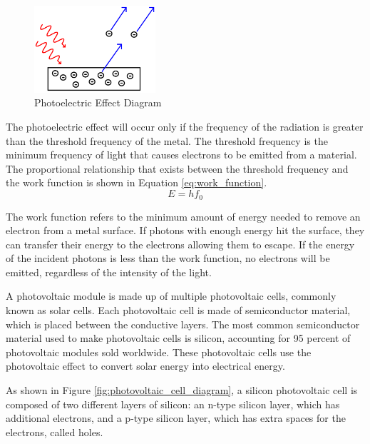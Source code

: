 \begin{figure}[ht]
    \centering
    \includegraphics[width=0.4\textwidth]{Figures/photoelectric_effect_diagram.png}
    \caption{Photoelectric Effect Diagram \cite{KhanAcademyPhotoelectricEffect}}
    \label{fig:photoelectric_effect_diagram}
\end{figure}
\FloatBarrier

\noindent The photoelectric effect will occur only if the frequency of the radiation is greater than the threshold frequency of the metal. The threshold frequency is the minimum frequency of light that causes electrons to be emitted from a material. The proportional relationship that exists between the threshold frequency and the work function is shown in Equation \ref{eq:work_function}.
\begin{equation}
    E = hf_0
    \label{eq:work_function}
\end{equation}

\noindent The work function refers to the minimum amount of energy needed to remove an electron from a metal surface. If photons with enough energy hit the surface, they can transfer their energy to the electrons allowing them to escape. If the energy of the incident photons is less than the work function, no electrons will be emitted, regardless of the intensity of the light. \cite{ScienceABC2023PhotoelectricBeginners}\vspace{0.5em}

\noindent A photovoltaic module is made up of multiple photovoltaic cells, commonly known as solar cells. Each photovoltaic cell is made of semiconductor material, which is placed between the conductive layers. The most common semiconductor material used to make photovoltaic cells is silicon, accounting for 95 percent of photovoltaic modules sold worldwide. \cite{U.S.DEPARTMENTofENERGYSolarBasics} These photovoltaic cells use the photovoltaic effect to convert solar energy into electrical energy.\vspace{0.5em}

\noindent As shown in Figure \ref{fig:photovoltaic_cell_diagram}, a silicon photovoltaic cell is composed of two different layers of silicon: an n-type silicon layer, which has additional electrons, and a p-type silicon layer, which has extra spaces for the electrons, called holes.\par

